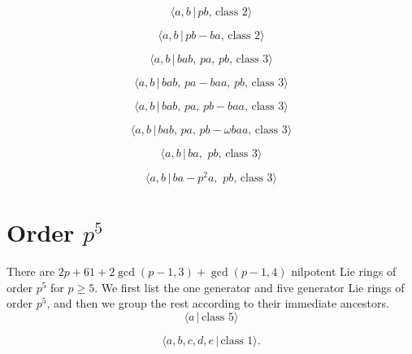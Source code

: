 \documentclass[10pt]{article}
\begin{document}
\begin{equation}
\langle a,b\,|\,pb,\,\text{class }2\rangle  \tag{4.7}
\end{equation}

\begin{equation}
\langle a,b\,|\,pb-ba,\,\text{class }2\rangle  \tag{4.8}
\end{equation}

\begin{equation}
\langle a,b\,|\,bab,\,pa,\,pb,\,\text{class }3\rangle  \tag{4.9}
\end{equation}

\begin{equation}
\langle a,b\,|\,bab,\,pa-baa,\,pb,\,\text{class }3\rangle  \tag{4.10}
\end{equation}

\begin{equation}
\langle a,b\,|\,bab,\,pa,\,pb-baa,\,\text{class }3\rangle  \tag{4.11}
\end{equation}

\begin{equation}
\langle a,b\,|\,bab,\,pa,\,pb-\omega baa,\,\text{class }3\rangle  \tag{4.12}
\end{equation}

\begin{equation}
\langle a,b\,|\,ba,\,\,pb,\,\text{class }3\rangle  \tag{4.13}
\end{equation}

\begin{equation}
\langle a,b\,|\,ba-p^{2}a,\,\,pb,\,\text{class }3\rangle  \tag{4.14}
\end{equation}

\section{Order $p^{5}$}

There are $2p+61+2\gcd (p-1,3)+\gcd (p-1,4)$ nilpotent Lie rings of order $%
p^{5}$ for $p\geq 5$. We first list the one generator and five generator Lie
rings of order $p^{5}$, and then we group the rest according to their
immediate ancestors.%
\begin{equation}
\langle a\,|\,\text{class }5\rangle  \tag{5.0}
\end{equation}

\begin{equation}
\langle a,b,c,d,e\,|\,\text{class }1\rangle .  \tag{5.1}
\end{equation}
\end{document}
